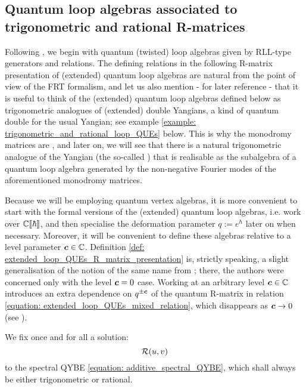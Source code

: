     \subsection{Quantum loop algebras associated to trigonometric and rational R-matrices} \label{subsection: trigonometric_and_rational_loop_QUEs}
        Following \cite{guay_regelskis_wendlandt_R_matrix_presentation_of_loop_QUEs}, we begin with quantum (twisted) loop algebras given by RLL-type generators and relations. The defining relations in the following R-matrix presentation of (extended) quantum loop algebras are natural from the point of view of the FRT formalism, and let us also mention - for later reference - that it is useful to think of the (extended) quantum loop algebras defined below as trigonometric analogues of (extended) double Yangians, a kind of quantum double for the usual Yangian; see example \ref{example: trigonometric_and_rational_loop_QUEs} below. This is why the monodromy matrices are , and later on, we will see that there is a natural trigonometric analogue of the Yangian (the so-called ) that is realisable as the subalgebra of a quantum loop algebra generated by the non-negative Fourier modes of the aforementioned monodromy matrices.

        Because we will be employing quantum vertex algebras, it is more convenient to start with the formal versions of the (extended) quantum loop algebras, i.e. work over $\mathbb{C}[\![\hbar]\!]$, and then specialise the deformation parameter $q := e^{\hbar}$ later on when necessary. Moreover, it will be convenient to define these algebras relative to a level parameter $\boldsymbol{c} \in \mathbb{C}$. Definition \ref{def: extended_loop_QUEs_R_matrix_presentation} is, strictly speaking, a slight generalisation of the notion of the same name from \cite{guay_regelskis_wendlandt_R_matrix_presentation_of_loop_QUEs}; there, the authors were concerned only with the level $\boldsymbol{c} = 0$ case. Working at an arbitrary level $\boldsymbol{c} \in \mathbb{C}$ introduces an extra dependence on $q^{\pm \boldsymbol{c}}$ of the quantum R-matrix in relation \eqref{equation: extended_loop_QUEs_mixed_relation}, which disappears as $\boldsymbol{c} \to 0$ (see \cite[Remark 3.6]{guay_regelskis_wendlandt_R_matrix_presentation_of_loop_QUEs}).

        We fix once and for all a solution:
            $$\mathcal{R}(u, v)$$
        to the spectral QYBE \eqref{equation: additive_spectral_QYBE}, which shall always be either trigonometric or rational.

